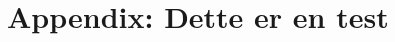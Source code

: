 \graphicspath{{Chapters/Appendices/}}

\chapter{Appendix: Dette er en test} %
\label{cha:dette_er_en_test}


